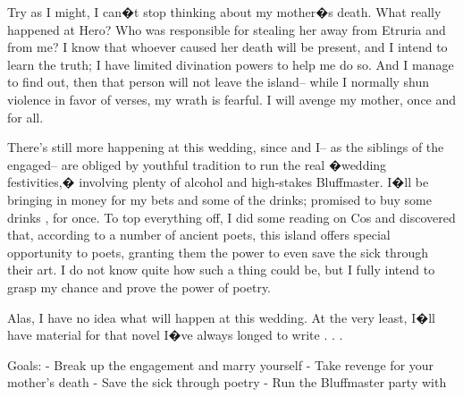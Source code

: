 \documentclass[char]{Kos}
\begin{document}
Try as I might, I can�t stop thinking about my mother�s death. What really happened at Hero? Who was responsible for stealing her away from Etruria and from me? I know that whoever caused her death will be present, and I intend to learn the truth; I have limited divination powers to help me do so. And I manage to find out, then that person will not leave the island-- while I normally shun violence in favor of verses, my wrath is fearful. I will avenge my mother, once and for all.

There's still more happening at this wedding, since \cWard{\nickname} and I-- as the siblings of the engaged-- are obliged by youthful tradition to run the real �wedding festivities,� involving plenty of alcohol and high-stakes Bluffmaster. I�ll be bringing in money for my bets and some of the drinks; \cWard{\nickname} promised to buy some drinks \cWard{\themself}, for once. To top everything off, I did some reading on Cos and discovered that, according to a number of ancient poets, this island offers special opportunity to poets, granting them the power to even save the sick through their art. I do not know quite how such a thing could be, but I fully intend to grasp my chance and prove the power of poetry.

Alas, I have no idea what will happen at this wedding. At the very least, I�ll have material for that novel I�ve always longed to write . . . 

Goals:
- Break up the engagement and marry \cBride{\nickname} yourself
- Take revenge for your mother's death
- Save the sick through poetry
- Run the Bluffmaster party with \cWard{\nickname}
\end{document}
